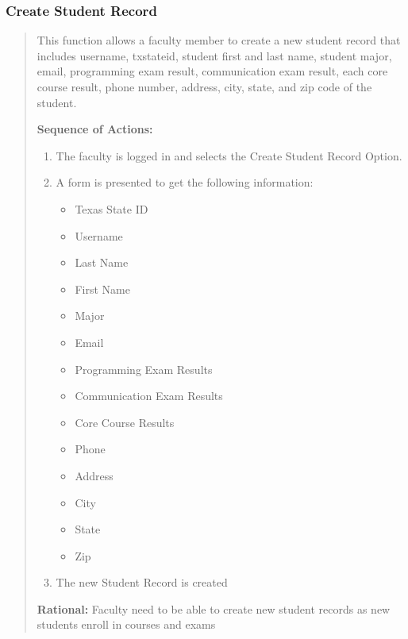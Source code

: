    \subsubsection{Create Student Record}
   \begin{quote} %
         This function allows a faculty member to create a new student
         record that includes username, txstateid, student first and last name,
         student major, email, programming exam result, communication exam
         result, each core course result, phone number, address, city, state,
         and zip code of the student.
         
         \textbf{Sequence of Actions:}
         \begin{enumerate}
            \item The faculty is logged in and selects the Create Student Record
               Option.
            \item A form is presented to get the following information:
               \begin{itemize}
                  \item Texas State ID
                  \item Username
                  \item Last Name
                  \item First Name
                  \item Major
                  \item Email
                  \item Programming Exam Results
                  \item Communication Exam Results
                  \item Core Course Results
                  \item Phone
                  \item Address
                  \item City
                  \item State
                  \item Zip
               \end{itemize}
            \item The new Student Record is created
      \end{enumerate}

         \textbf{Rational:}
         Faculty need to be able to create new student records as new students
         enroll in courses and exams
   \end{quote} %

